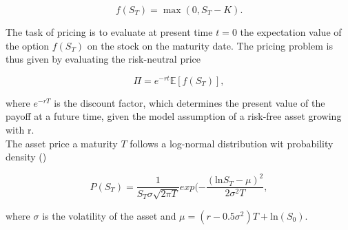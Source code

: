 \documentclass[../main.tex]{subfiles}
\begin{document}
\begin{equation}
    f(S_T) = \max(0, S_T - K ).
\end{equation}

The task of pricing is to evaluate at present time $t = 0$ the expectation value of the option $f(S_T)$ on the stock on the maturity date.
The pricing problem is thus given by evaluating the risk-neutral price

\begin{equation}
    \Pi = e^{-rt} \mathbb{E}[f(S_T)],
\end{equation}

where $e^{-rT}$ is the discount factor, which determines the present value of the payoff at a future time, given the model assumption of a risk-free asset growing with r.\\
The asset price a maturity $T$ follows a log-normal distribution wit probability density (\cite{1905.02666})

\begin{equation}
    P(S_T) = \frac{1}{S_T \sigma \sqrt{2 \pi T}} exp (- \frac{(\text{ln} S_T - \mu)^2}{2 \sigma^2 T}, \label{eq:lognormal}
\end{equation}

where $\sigma$ is the volatility of the asset and $\mu = (r-0.5\sigma^2)T + \text{ln}(S_0)$.

\biblio
\end{document}
